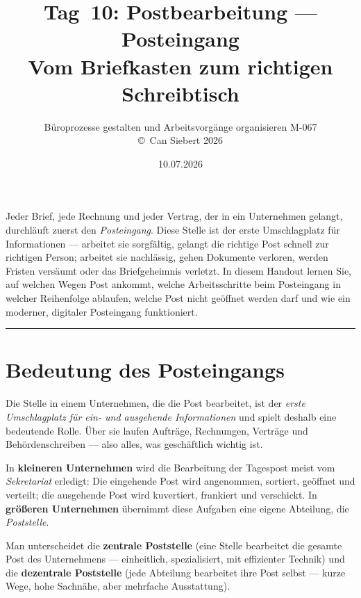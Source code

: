 \documentclass[11pt, a4paper]{article}
\title{\vspace*{-1.5cm}\Huge\bfseries\color{bfwPrimaryDark}Tag~10: Postbearbeitung --- Posteingang\\[0.4em]
  \large\color{bfwInkSoft}\textnormal{Vom Briefkasten zum richtigen Schreibtisch}}
\author{\textsf{Büroprozesse gestalten und Arbeitsvorgänge organisieren \textperiodcentered{} M-067}\\
\textsf{\small\copyright\ Can Siebert\,\textperiodcentered\,2026}}
\date{10.07.2026}
\begin{document}
\maketitle
\thispagestyle{empty}

\vspace{1em}
\begin{merksatz}[title={\bfseries Worum geht es heute?}]
Jeder Brief, jede Rechnung und jeder Vertrag, der in ein Unternehmen gelangt, durchläuft
zuerst den \emph{Posteingang}. Diese Stelle ist der erste Umschlagplatz für Informationen
--- arbeitet sie sorgfältig, gelangt die richtige Post schnell zur richtigen Person; arbeitet
sie nachlässig, gehen Dokumente verloren, werden Fristen versäumt oder das Briefgeheimnis
verletzt. In diesem Handout lernen Sie, auf welchen Wegen Post ankommt, welche Arbeitsschritte
beim Posteingang in welcher Reihenfolge ablaufen, welche Post nicht geöffnet werden darf und
wie ein moderner, digitaler Posteingang funktioniert.
\end{merksatz}

\tableofcontents
\vspace{1em}
\hrule
\vspace{1em}

\section{Bedeutung des Posteingangs}

Die Stelle in einem Unternehmen, die die Post bearbeitet, ist der \emph{erste Umschlagplatz
für ein- und ausgehende Informationen} und spielt deshalb eine bedeutende Rolle. Über sie
laufen Aufträge, Rechnungen, Verträge und Behördenschreiben --- also alles, was geschäftlich
wichtig ist.

In \textbf{kleineren Unternehmen} wird die Bearbeitung der Tagespost meist vom
\emph{Sekretariat} erledigt: Die eingehende Post wird angenommen, sortiert, geöffnet und
verteilt; die ausgehende Post wird kuvertiert, frankiert und verschickt. In \textbf{größeren
Unternehmen} übernimmt diese Aufgaben eine eigene Abteilung, die \emph{Poststelle}.

\begin{merksatz}
Man unterscheidet die \textbf{zentrale Poststelle} (eine Stelle bearbeitet die gesamte Post
des Unternehmens --- einheitlich, spezialisiert, mit effizienter Technik) und die
\textbf{dezentrale Poststelle} (jede Abteilung bearbeitet ihre Post selbst --- kurze Wege,
hohe Sachnähe, aber mehrfache Ausstattung).
\end{merksatz}
\end{document}
